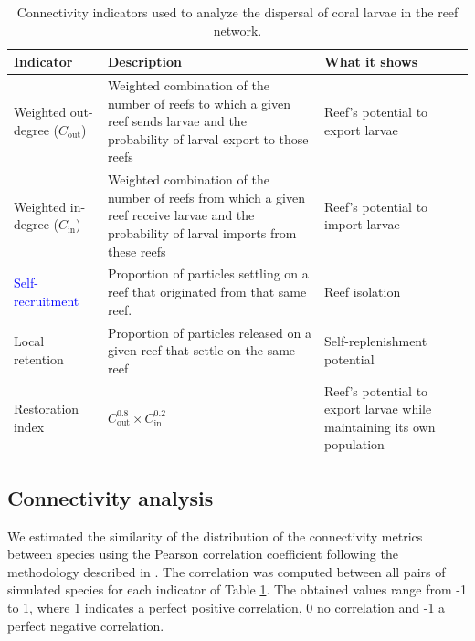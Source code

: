 \documentclass[preprint,12pt,authoryear]{elsarticle}
\newcommand{\modif}[1]{\textcolor{blue}{#1}}
\begin{document}
	\begin{table}
		\begin{adjustwidth}{-1in}{-1in}
			\centering
			\small
			\begin{tabular}{p{}p{}p{}}
				\hline
				\textbf{Indicator} & \textbf{Description} & \textbf{What it shows} \\
				\hline
				Weighted out-degree ($C_\text{out}$) & Weighted combination of the number of reefs to which a given reef sends larvae and the probability of larval export to those reefs & Reef's potential to export larvae \\
				Weighted in-degree ($C_\text{in}$) & Weighted combination of the number of reefs from which a given reef receive larvae and the probability of larval imports from these reefs & Reef's potential to import larvae \\
				\modif{Self-recruitment} & Proportion of particles settling on a reef that originated from that same reef. & Reef isolation \\
				Local retention & Proportion of particles released on a given reef that settle on the same reef & Self-replenishment potential \\
				Restoration index & $C_\text{out}^{0.8} \times C_\text{in}^{0.2}$ & Reef's potential to export larvae while maintaining its own population \\
				\hline
			\end{tabular}
		\end{adjustwidth}
		\caption{Connectivity indicators used to analyze the dispersal of coral larvae in the reef network.}\label{tab:indicators}
	\end{table}
	
	\subsection*{Connectivity analysis}
	
	We estimated the similarity of the distribution of the connectivity metrics between species using the Pearson correlation coefficient following the methodology described in \cite{boccaletti2014structure}. The correlation was computed between all pairs of simulated species for each indicator of Table \ref{tab:indicators}. The obtained values range from -1 to 1, where 1 indicates a perfect positive correlation, 0 no correlation and -1 a perfect negative correlation.
	
\end{document}
